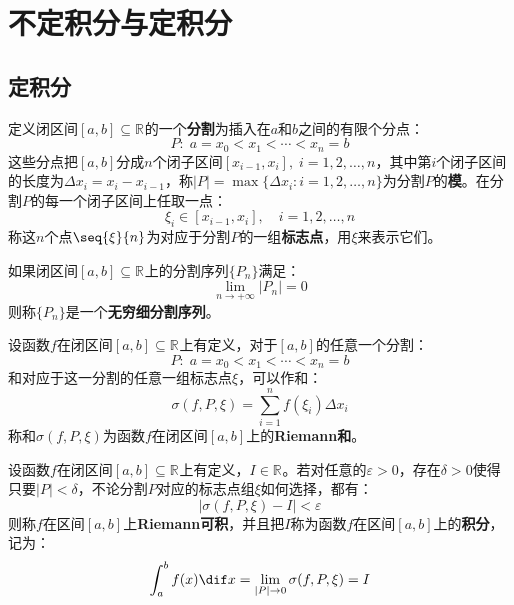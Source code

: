 \chapter{不定积分与定积分}

\section{定积分}
\begin{definition}
	定义闭区间$[a,b]\subseteq\mathbb{R}^{}$的一个\textbf{分割}为插入在$a$和$b$之间的有限个分点：
	\begin{equation*}
		P:\;a=x_0<x_1<\cdots<x_n=b
	\end{equation*}
	这些分点把$[a,b]$分成$n$个闭子区间$[x_{i-1},x_{i}],\;i=1,2,\dots,n$，其中第$i$个闭子区间的长度为$\Delta x_i=x_i-x_{i-1}$，称$|P|=\max\{\Delta x_i:i=1,2,\dots,n\}$为分割$P$的\textbf{模}。在分割$P$的每一个闭子区间上任取一点：
	\begin{equation*}
		\xi_i\in[x_{i-1},x_i],\quad i=1,2,\dots,n
	\end{equation*}
	称这$n$个点$\seq{\xi}{n}$为对应于分割$P$的一组\textbf{标志点}，用$\xi$来表示它们。
\end{definition}
\begin{definition}
	如果闭区间$[a,b]\subseteq\mathbb{R}^{}$上的分割序列$\{P_n\}$满足：
	\begin{equation*}
		\lim_{n\to+\infty}|P_n|=0
	\end{equation*}
	则称$\{P_n\}$是一个\textbf{无穷细分割序列}。
\end{definition}
\begin{definition}
	设函数$f$在闭区间$[a,b]\subseteq\mathbb{R}^{}$上有定义，对于$[a,b]$的任意一个分割：
	\begin{equation*}
		P:\;a=x_0<x_1<\cdots<x_n=b
	\end{equation*}
	和对应于这一分割的任意一组标志点$\xi$，可以作和：
	\begin{equation*}
		\sigma(f,P,\xi)=\sum_{i=1}^{n}f(\xi_i)\Delta x_i
	\end{equation*}
	称和$\sigma(f,P,\xi)$为函数$f$在闭区间$[a,b]$上的\textbf{Riemann和}。
\end{definition}
\begin{definition}
	设函数$f$在闭区间$[a,b]\subseteq\mathbb{R}^{}$上有定义，$I\in\mathbb{R}^{}$。若对任意的$\varepsilon>0$，存在$\delta>0$使得只要$|P|<\delta$，不论分割$P$对应的标志点组$\xi$如何选择，都有：
	\begin{equation*}
		|\sigma(f,P,\xi)-I|<\varepsilon
	\end{equation*}
	则称$f$在区间$[a,b]$上\textbf{Riemann可积}，并且把$I$称为函数$f$在区间$[a,b]$上的\textbf{积分}，记为：
	\begin{equation*}
		\int_{a}^{b}f(x)\dif x=\lim_{|P|\to0}\sigma(f,P,\xi)=I
	\end{equation*}
\end{definition}

